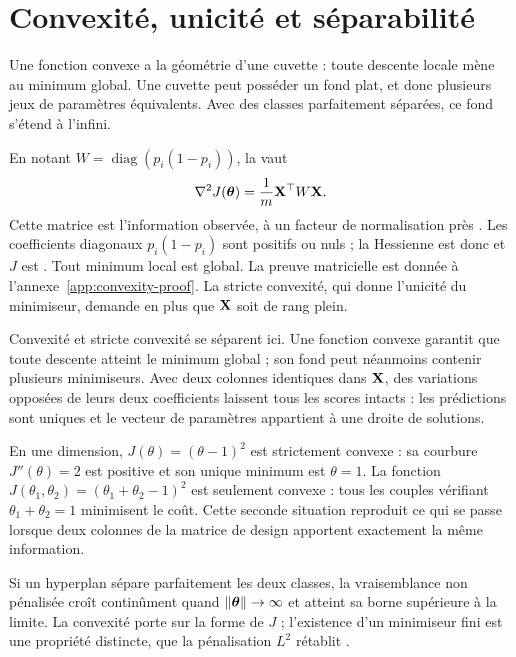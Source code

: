 \section{Convexité, unicité et séparabilité}

\begin{lecture}
Une fonction convexe a la géométrie d'une cuvette : toute descente locale mène au
minimum global. Une cuvette peut posséder un fond plat, et donc plusieurs jeux de
paramètres équivalents. Avec des classes parfaitement séparées, ce fond s'étend à
l'infini.
\end{lecture}

En notant $W=\operatorname{diag}(p_i(1-p_i))$, la  vaut
\[
  \nabla^2J(\boldsymbol{\theta})=\frac1m\mathbf{X}^\top W\mathbf{X}.
\]
Cette matrice  est l'information observée, à un facteur de
normalisation près \cite[équations~4.22--4.25]{hastie2009}.
Les coefficients diagonaux $p_i(1-p_i)$ sont positifs ou nuls ; la Hessienne est
donc  et $J$ est . Tout minimum local est global. La
preuve matricielle est donnée à l'annexe~\ref{app:convexity-proof}. La stricte
convexité, qui donne l'unicité du minimiseur, demande en plus que $\mathbf{X}$ soit de
rang plein.

Convexité et stricte convexité se séparent ici. Une fonction convexe garantit que
toute descente atteint le minimum global ; son fond peut néanmoins contenir
plusieurs minimiseurs. Avec deux colonnes identiques dans $\mathbf{X}$, des variations
opposées de leurs deux coefficients laissent tous les scores intacts : les
prédictions sont uniques et le vecteur de paramètres appartient à une droite de
solutions.

En une dimension, $J(\theta)=(\theta-1)^2$ est strictement convexe : sa courbure
$J''(\theta)=2$ est positive et son unique minimum est $\theta=1$. La fonction
$J(\theta_1,\theta_2)=(\theta_1+\theta_2-1)^2$ est seulement convexe : tous les
couples vérifiant $\theta_1+\theta_2=1$ minimisent le coût. Cette seconde
situation reproduit ce qui se passe lorsque deux colonnes de la matrice de design
apportent exactement la même information.

\begin{vigilance}
Si un hyperplan sépare parfaitement les deux classes, la vraisemblance non
pénalisée croît continûment quand $\|\boldsymbol{\theta}\|\to\infty$ et atteint sa borne
supérieure à la limite. La convexité porte sur la forme de $J$ ; l'existence d'un
minimiseur fini est une propriété distincte, que la pénalisation $L^2$ rétablit
\cite{albert1984}.
\end{vigilance}

